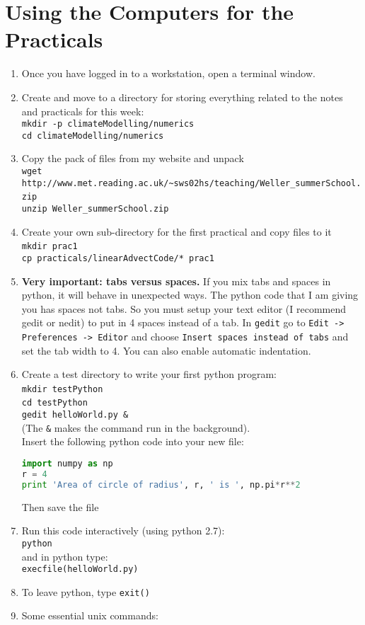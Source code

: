 %
\cleardoublepage{}

%

\section{{\large{}Using the Computers for the Practicals}}
\begin{enumerate}
\item Once you have logged in to a workstation, open a terminal window.
\item Create and move to a directory for storing everything related to the
notes and practicals for this week:\\
\texttt{mkdir -p climateModelling/numerics}\\
\texttt{cd climateModelling/numerics}
\item Copy the pack of files from my website and unpack\\
\texttt{\footnotesize{}wget http://www.met.reading.ac.uk/\textasciitilde{}sws02hs/teaching/Weller\_summerSchool.zip}\texttt{}~\\
\texttt{unzip Weller\_summerSchool.zip}
\item Create your own sub-directory for the first practical and copy files
to it\\
\texttt{mkdir prac1}~\\
\texttt{cp practicals/linearAdvectCode/{*} prac1}
\item \textbf{Very important: tabs versus spaces.} If you mix tabs and spaces
in python, it will behave in unexpected ways. The python code that
I am giving you has spaces not tabs. So you must setup your text editor
(I recommend gedit or nedit) to put in 4 spaces instead of a tab.
In \texttt{gedit} go to \texttt{Edit -> Preferences -> Editor} and
choose \texttt{Insert spaces instead of tabs} and set the tab width
to 4. You can also enable automatic indentation.
\item Create a test directory to write your first python program:\\
\texttt{mkdir testPython}~\\
\texttt{cd testPython}~\\
\texttt{gedit helloWorld.py \&}\\
(The \texttt{\&} makes the command run in the background). \\
Insert the following python code into your new file:\\
\begin{lstlisting}[language=Python]
import numpy as np
r = 4
print 'Area of circle of radius', r, ' is ', np.pi*r**2
\end{lstlisting}
Then save the file
\item Run this code interactively (using python 2.7):\\
\texttt{python}\\
and in python type:\\
\texttt{execfile(\textquotedbl{}helloWorld.py\textquotedbl{})}
\item To leave python, type \texttt{exit()}
\item Some essential unix commands:



\end{enumerate}
